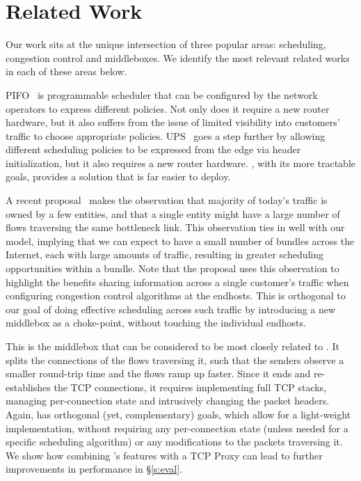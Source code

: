 \section{Related Work}
\label{s:related}

Our work sits at the unique intersection of three popular areas: scheduling, congestion control and middleboxes. We identify the most relevant related works in each of these areas below. 

 PIFO~\cite{pifo} is programmable scheduler that can be configured by the network operators to express different policies. Not only does it require a new router hardware, but it also suffers from the issue of limited visibility into customers' traffic to choose appropriate policies. UPS~\cite{ups} goes a step further by allowing different scheduling policies to be expressed from the edge via header initialization, 
but it also requires a new router hardware. \name, with its more tractable goals, provides a solution that is far easier to deploy. 

 A recent proposal~\cite{fivecomps} makes the observation that majority of today's traffic is owned by a few entities, and that a single entity might have a large number of flows traversing the same bottleneck link. This observation ties in well with our model, implying that we can expect to have a small number of bundles across the Internet, each with large amounts of traffic, resulting in greater scheduling opportunities within a bundle. Note that the proposal uses this observation to highlight the benefits sharing information across a single customer's traffic when configuring congestion control algorithms at the endhosts. This is orthogonal to our goal of doing effective scheduling across such traffic by introducing a new middlebox as a choke-point, without touching the individual endhosts. 

 This is the middlebox that can be considered to be most closely related to \name. It splits the connections of the flows traversing it, such that the senders observe a smaller round-trip time and the flows ramp up faster. Since it ends and re-establishes the TCP connections, it requires implementing full TCP stacks, managing per-connection state and intrusively changing the packet headers. Again, \name has orthogonal (yet, complementary) goals, which allow for a light-weight implementation, without requiring any per-connection state (unless needed for a specific scheduling algorithm) or any modifications to the packets traversing it. We show how combining \name's features with a TCP Proxy can lead to further improvements in performance in \S\ref{s:eval}.  



